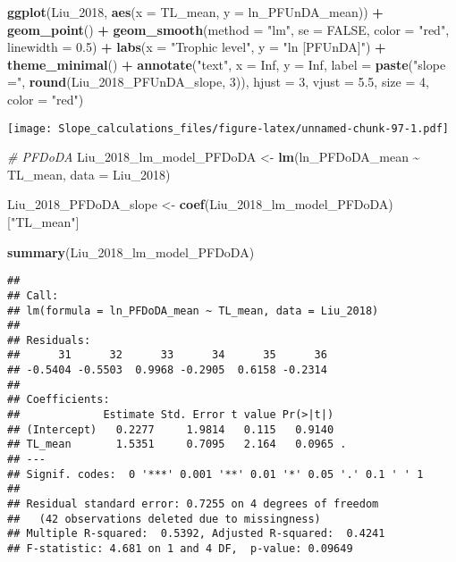 \documentclass[
]{article}
\newenvironment{Shaded}{\begin{snugshade}}{\end{snugshade}}
\newcommand{\AttributeTok}[1]{\textcolor[rgb]{0.13,0.29,0.53}{#1}}
\newcommand{\CommentTok}[1]{\textcolor[rgb]{0.56,0.35,0.01}{\textit{#1}}}
\newcommand{\ConstantTok}[1]{\textcolor[rgb]{0.56,0.35,0.01}{#1}}
\newcommand{\DecValTok}[1]{\textcolor[rgb]{0.00,0.00,0.81}{#1}}
\newcommand{\FloatTok}[1]{\textcolor[rgb]{0.00,0.00,0.81}{#1}}
\newcommand{\FunctionTok}[1]{\textcolor[rgb]{0.13,0.29,0.53}{\textbf{#1}}}
\newcommand{\NormalTok}[1]{#1}
\newcommand{\OtherTok}[1]{\textcolor[rgb]{0.56,0.35,0.01}{#1}}
\newcommand{\SpecialCharTok}[1]{\textcolor[rgb]{0.81,0.36,0.00}{\textbf{#1}}}
\newcommand{\StringTok}[1]{\textcolor[rgb]{0.31,0.60,0.02}{#1}}
\begin{document}
\begin{Shaded}
\begin{Highlighting}[]
\FunctionTok{ggplot}\NormalTok{(Liu\_2018, }\FunctionTok{aes}\NormalTok{(}\AttributeTok{x =}\NormalTok{ TL\_mean, }\AttributeTok{y =}\NormalTok{ ln\_PFUnDA\_mean)) }\SpecialCharTok{+}
  \FunctionTok{geom\_point}\NormalTok{() }\SpecialCharTok{+}
  \FunctionTok{geom\_smooth}\NormalTok{(}\AttributeTok{method =} \StringTok{"lm"}\NormalTok{, }\AttributeTok{se =} \ConstantTok{FALSE}\NormalTok{, }\AttributeTok{color =} \StringTok{"red"}\NormalTok{, }\AttributeTok{linewidth =} \FloatTok{0.5}\NormalTok{) }\SpecialCharTok{+}
  \FunctionTok{labs}\NormalTok{(}\AttributeTok{x =} \StringTok{"Trophic level"}\NormalTok{,}
       \AttributeTok{y =} \StringTok{"ln [PFUnDA]"}\NormalTok{) }\SpecialCharTok{+}
  \FunctionTok{theme\_minimal}\NormalTok{() }\SpecialCharTok{+}
  \FunctionTok{annotate}\NormalTok{(}\StringTok{"text"}\NormalTok{, }\AttributeTok{x =} \ConstantTok{Inf}\NormalTok{, }\AttributeTok{y =} \ConstantTok{Inf}\NormalTok{, }\AttributeTok{label =} \FunctionTok{paste}\NormalTok{(}\StringTok{"slope ="}\NormalTok{, }\FunctionTok{round}\NormalTok{(Liu\_2018\_PFUnDA\_slope, }\DecValTok{3}\NormalTok{)), }
           \AttributeTok{hjust =} \DecValTok{3}\NormalTok{, }\AttributeTok{vjust =} \FloatTok{5.5}\NormalTok{, }\AttributeTok{size =} \DecValTok{4}\NormalTok{, }\AttributeTok{color =} \StringTok{"red"}\NormalTok{)}
\end{Highlighting}
\end{Shaded}

\texttt{[image: Slope\_calculations\_files/figure-latex/unnamed-chunk-97-1.pdf]}

\begin{Shaded}
\begin{Highlighting}[]
\CommentTok{\# PFDoDA}
\NormalTok{Liu\_2018\_lm\_model\_PFDoDA }\OtherTok{\textless{}{-}} \FunctionTok{lm}\NormalTok{(ln\_PFDoDA\_mean }\SpecialCharTok{\textasciitilde{}}\NormalTok{ TL\_mean,}
                             \AttributeTok{data =}\NormalTok{ Liu\_2018)}

\NormalTok{Liu\_2018\_PFDoDA\_slope }\OtherTok{\textless{}{-}} \FunctionTok{coef}\NormalTok{(Liu\_2018\_lm\_model\_PFDoDA)[}\StringTok{"TL\_mean"}\NormalTok{]}

\FunctionTok{summary}\NormalTok{(Liu\_2018\_lm\_model\_PFDoDA)}
\end{Highlighting}
\end{Shaded}

\begin{verbatim}
## 
## Call:
## lm(formula = ln_PFDoDA_mean ~ TL_mean, data = Liu_2018)
## 
## Residuals:
##      31      32      33      34      35      36 
## -0.5404 -0.5503  0.9968 -0.2905  0.6158 -0.2314 
## 
## Coefficients:
##             Estimate Std. Error t value Pr(>|t|)  
## (Intercept)   0.2277     1.9814   0.115   0.9140  
## TL_mean       1.5351     0.7095   2.164   0.0965 .
## ---
## Signif. codes:  0 '***' 0.001 '**' 0.01 '*' 0.05 '.' 0.1 ' ' 1
## 
## Residual standard error: 0.7255 on 4 degrees of freedom
##   (42 observations deleted due to missingness)
## Multiple R-squared:  0.5392, Adjusted R-squared:  0.4241 
## F-statistic: 4.681 on 1 and 4 DF,  p-value: 0.09649
\end{verbatim}
\end{document}
